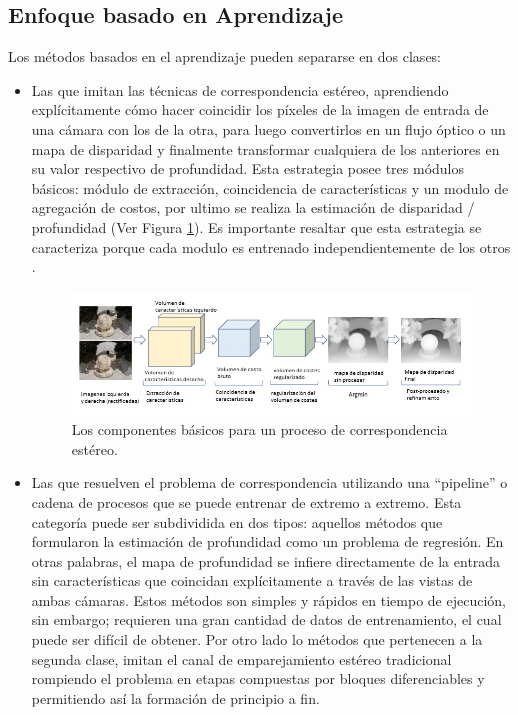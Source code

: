 \subsection{Enfoque basado en Aprendizaje}
Los métodos basados en el aprendizaje pueden separarse en dos clases:
\begin{itemize}
    \item Las que imitan las técnicas de correspondencia estéreo, aprendiendo explícitamente cómo hacer coincidir los píxeles de la imagen de entrada de una cámara con los de la otra, para luego convertirlos en un flujo óptico o un mapa de disparidad y finalmente transformar cualquiera de los anteriores en su valor respectivo de profundidad. Esta estrategia posee tres módulos básicos: módulo de extracción, coincidencia de características y un modulo de agregación de costos, por ultimo se realiza la estimación de disparidad / profundidad (Ver Figura \ref{mimicStereo}). Es importante resaltar que esta estrategia se caracteriza porque cada modulo es entrenado independientemente de los otros \cite{laga2020survey}.
    \begin{figure}[H]
        \centering
        \includegraphics[scale=0.6]{Recursos/mimicStereo.jpg}
        \caption{Los componentes básicos para un proceso de correspondencia estéreo.}
        \label{mimicStereo}
    \end{figure}
    \item Las que resuelven el problema de correspondencia utilizando una ``pipeline'' o cadena de procesos que se puede entrenar de extremo a extremo. Esta categoría puede ser subdividida en dos tipos: aquellos métodos que formularon la estimación de profundidad como un problema de regresión. En otras palabras, el mapa de profundidad se infiere directamente de la entrada sin características que coincidan explícitamente a través de las vistas de ambas cámaras. Estos métodos son simples y rápidos en tiempo de ejecución, sin embargo; requieren una gran cantidad de datos de entrenamiento, el cual puede ser difícil de obtener. Por otro lado lo métodos que pertenecen a la segunda clase, imitan el canal de emparejamiento estéreo tradicional rompiendo el problema en etapas compuestas por bloques diferenciables y permitiendo así la formación de principio a fin.
\end{itemize}
